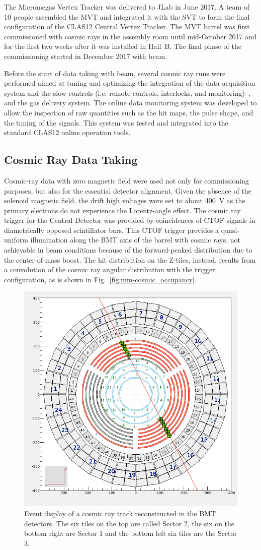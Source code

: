 The Micromegas Vertex Tracker was delivered to JLab in June 2017. A team of 10 people assembled the MVT and integrated
it with the SVT to form the final configuration of the CLAS12 Central Vertex Tracker. The MVT barrel was first commissioned
with cosmic rays in the assembly room until mid-October 2017 and for the first two weeks after it was installed in Hall~B. The
final phase of the commissioning started in December 2017 with beam.

Before the start of data taking with beam, several cosmic ray runs were performed aimed at tuning and optimizing the
integration of the data acquisition system and the slow-controls (i.e. remote controls, interlocks, and 
monitoring)~\cite{daq-nim},
and the gas delivery system. The online data monitoring system was developed to allow the inspection of raw quantities such as the
hit maps, the pulse shape, and the timing of the signals. This system was tested and integrated into the standard CLAS12
online operation tools. 

\subsection{Cosmic Ray Data Taking}
\label{sec:cosmics}

Cosmic-ray data with zero magnetic field were used not only for commissioning purposes, but also for the essential detector
alignment. Given the absence of the solenoid magnetic field, the drift high voltages were set to about 400~V as the primary
electrons do not experience the Lorentz-angle effect. The cosmic ray trigger for the Central Detector was provided by
coincidences of CTOF signals in diametrically opposed scintillator bars. This CTOF trigger provides a quasi-uniform
illumination along the BMT axis of the barrel with cosmic rays, not achievable in beam conditions because of the forward-peaked
distribution due to the center-of-mass boost. The hit distribution on the Z-tiles, instead, results from a convolution of the cosmic
ray angular distribution with the trigger configuration, as is shown in Fig.~\ref{fig:mm-cosmic_occupancy}.



\begin{figure}[htb]
\centering
 \includegraphics[width=.4\textwidth]{images/cosmic_NIM.png}
 \caption{Event display of a cosmic ray track reconstructed in the BMT detectors. The six tiles on the top are called Sector 2, the six on the bottom right are Sector 1 and the bottom left six tiles are the Sector 3.}
 \label{fig:mm-cosmic_ced}
\end{figure}


